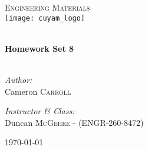 \begin{titlepage}
\begin{center}

\textsc{\Large Engineering Materials}\\[0.5cm]
\texttt{[image: cuyam\_logo]}

\HRule \\[0.4cm]
{ \LARGE \bfseries Homework Set 8}\\[0.5cm]

\HRule \\[1.5cm]

\begin{minipage}{0.4\textwidth}
\begin{flushleft} \large
\emph{Author:}\\
Cameron \textsc{Carroll}
\end{flushleft}
\end{minipage}
\begin{minipage}{0.4\textwidth}
\begin{flushright} \large
\emph{Instructor \& Class:}\\
Duncan \textsc{McGehee} - (ENGR-260-8472)
\end{flushright}
\end{minipage}

\vfill

{\large \today}

\end{center}
\end{titlepage}